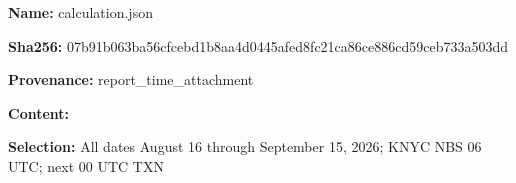 \documentclass[11pt]{article}
\begin{document}
\par\noindent\textbf{Name:} calculation.json

\par\noindent\textbf{Sha256:} 07b91b063ba5\hspace{0pt}6cfcebd1b8aa\hspace{0pt}4d0445afed8f\hspace{0pt}c21ca86ce886\hspace{0pt}cd59ceb733a5\hspace{0pt}03dd

\par\noindent\textbf{Provenance:} report\_time\_attachment

\par\noindent\textbf{Content:} \par \par\noindent\textbf{Selection:} All dates August 16 through September 15, 2026; KNYC NBS 06 UTC; next 00 UTC TXN
\end{document}
